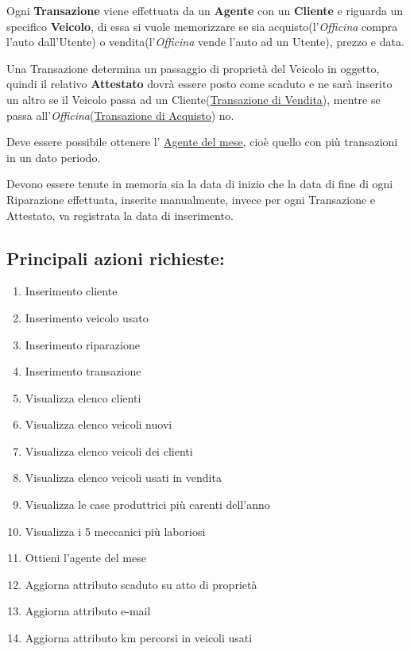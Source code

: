 \documentclass[a4paper,12pt]{report}
\begin{document}
Ogni \textbf{Transazione} viene effettuata da un \textbf{Agente} con un \textbf{Cliente} e riguarda un specifico \textbf{Veicolo},
%
di essa si vuole memorizzare se sia acquisto(l'\textit{Officina} compra l'auto dall'Utente) o vendita(l'\textit{Officina} 
% 
vende l'auto ad un Utente), prezzo e data. 

\noindent
Una Transazione determina un passaggio di proprietà del Veicolo in oggetto, quindi il relativo \textbf{Attestato} 
%
dovrà essere posto come scaduto e ne sarà inserito un altro se il Veicolo passa ad un Cliente(\underline{Transazione di Vendita}),
%
mentre se passa all'\textit{Officina}(\underline{Transazione di Acquisto}) no.

Deve essere possibile ottenere l' \underline{Agente del mese}, cioè quello con più transazioni in un dato periodo. 

Devono essere tenute in memoria sia la data di inizio che la data di fine di ogni Riparazione effettuata, inserite manualmente,
%
invece per ogni Transazione e Attestato, va registrata la data di inserimento.

\subsection*{Principali azioni richieste:}
\begin{enumerate}
	\item Inserimento cliente
	\item Inserimento veicolo usato
	\item Inserimento riparazione
	\item Inserimento transazione
	\item Visualizza elenco clienti
	\item Visualizza elenco veicoli nuovi
	\item Visualizza elenco veicoli dei clienti
	\item Visualizza elenco veicoli usati in vendita 
	\item Visualizza le case produttrici più carenti dell'anno 
	\item Visualizza i 5 meccanici più laboriosi
	\item Ottieni l'agente del mese
	\item Aggiorna attributo scaduto su atto di proprietà
	\item Aggiorna attributo e-mail
	\item Aggiorna attributo km percorsi in veicoli usati 
\end{enumerate}
\end{document}
